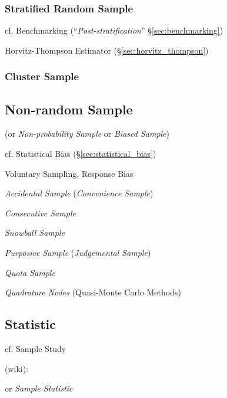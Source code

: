 \subsubsection{Stratified Random Sample}\label{sec:stratified_random_sample}

cf. Benchmarking (``\emph{Post-stratification}'' \S\ref{sec:benchmarking})

Horvitz-Thompson Estimator (\S\ref{sec:horvitz_thompson})



\subsubsection{Cluster Sample}\label{sec:cluster_sample}



\subsection{Non-random Sample}\label{sec:nonrandom_sample}

(or \emph{Non-probability Sample} or \emph{Biased Sample})

cf. Statistical Bias (\S\ref{sec:statistical_bias})

Voluntary Sampling, Response Bias

\emph{Accidental Sample} (\emph{Convenience Sample})

\emph{Consecutive Sample}

\emph{Snowball Sample}

\emph{Purposive Sample} (\emph{Judgemental Sample})

\emph{Quota Sample}

\emph{Quadrature Nodes} (Quasi-Monte Carlo Methods) %



\subsection{Statistic}\label{sec:statistic}

cf. Sample Study

(wiki):

or \emph{Sample Statistic}

